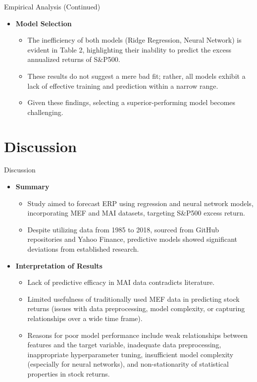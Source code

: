 \documentclass{beamer}
\begin{document}
\begin{frame}{Empirical Analysis (Continued)}
    \begin{itemize}
            \item \textbf{Model Selection}
            \begin{itemize}
                \item The inefficiency of both models (Ridge Regression, Neural Network) is evident in Table 2, highlighting their inability to predict the excess annualized returns of S\&P500.
                \item These results do not suggest a mere bad fit; rather, all models exhibit a lack of effective training and prediction within a narrow range.
                \item Given these findings, selecting a superior-performing model becomes challenging.
            \end{itemize}
    \end{itemize}
\end{frame}

\section{Discussion}
\begin{frame}{Discussion}
  \begin{itemize}
    \item \textbf{Summary} 
    \begin{itemize}
        \item Study aimed to forecast ERP using regression and neural network models, incorporating MEF and MAI datasets, targeting S\&P500 excess return.
        \item Despite utilizing data from 1985 to 2018, sourced from GitHub repositories and Yahoo Finance, predictive models showed significant deviations from established research.
    \end{itemize}
    \item \textbf{Interpretation of Results}
    \begin{itemize}
        \item Lack of predictive efficacy in MAI data contradicts literature.
        \item Limited usefulness of traditionally used MEF data in predicting stock returns (issues with data preprocessing, model complexity, or capturing relationships over a wide time frame).
        \item  Reasons for poor model performance include weak relationships between features and the target variable, inadequate data preprocessing, inappropriate hyperparameter tuning, insufficient model complexity (especially for neural networks), and non-stationarity of statistical properties in stock returns.
    \end{itemize}
  \end{itemize}
\end{frame}
\end{document}
